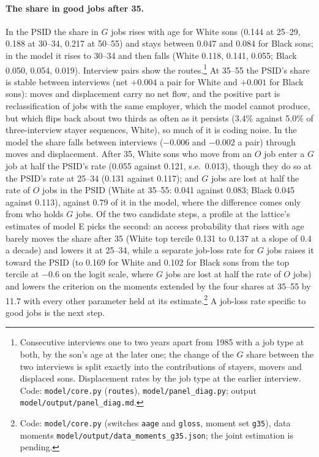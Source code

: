 \paragraph{The share in good jobs after 35.} In the PSID the share in $G$ jobs rises with age for White sons (0.144 at 25--29, 0.188 at 30--34, 0.217 at 50--55)
and stays between 0.047 and 0.084 for Black sons; in the model it rises to 30--34 and then falls (White 0.118, 0.141,
0.055; Black 0.050, 0.054, 0.019). Interview pairs show the routes.\footnote{Consecutive interviews one to two years apart from 1985 with a
job type at both, by the son's age at the later one; the change of the $G$ share between the two interviews is split
exactly into the contributions of stayers, movers and displaced sons. Displacement rates by the job type at the
earlier interview. Code: \texttt{model/core.py} (\texttt{routes}), \texttt{model/panel\_diag.py}; output
\texttt{model/output/panel\_diag.md}.} At 35--55 the PSID's share is stable between interviews (net
$+0.004$ a pair for White and $+0.001$ for Black sons): moves and displacement carry no net flow, and the positive part
is reclassification of jobs with the same employer, which the model cannot produce, but which flips back about two
thirds as often as it persists (3.4\% against 5.0\% of three-interview stayer sequences, White), so much of it is coding
noise. In the model the share falls between interviews ($-0.006$ and $-0.002$ a pair) through moves and displacement.
After 35, White sons who move from an $O$ job enter a $G$ job at half the PSID's rate (0.055 against 0.121, s.e.\
0.013), though they do so at the PSID's rate at 25--34 (0.131 against 0.117); and $G$ jobs are lost at half the rate of
$O$ jobs in the PSID (White at 35--55: 0.041 against 0.083; Black 0.045 against 0.113), against 0.79 of it in the model,
where the difference comes only from who holds $G$ jobs. Of the two candidate steps, a profile at the lattice's estimates of
model E picks the second: an access probability that rises with age barely moves the share after 35 (White top
tercile 0.131 to 0.137 at a slope of 0.4 a decade) and lowers it at 25--34, while a separate job-loss rate for $G$ jobs
raises it toward the PSID (to 0.169 for White and 0.102 for Black sons from the top tercile at $-0.6$ on the logit
scale, where $G$ jobs are lost at half the rate of $O$ jobs) and lowers the criterion on the moments extended by the
four shares at 35--55 by 11.7 with every other parameter held at its estimate.\footnote{Code: \texttt{model/core.py}
(switches \texttt{aage} and \texttt{gloss}, moment set \texttt{g35}), data moments
\texttt{model/output/data\_moments\_g35.json}; the joint estimation is pending.} A job-loss rate specific to
good jobs is the next step.
